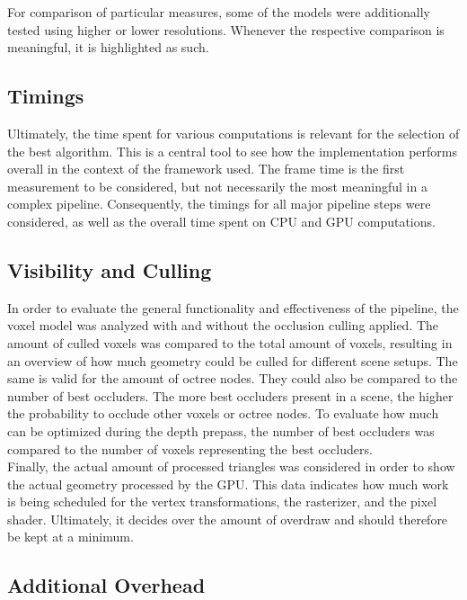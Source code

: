 \noindent
For comparison of particular measures, some of the models were additionally tested using higher or lower resolutions.
Whenever the respective comparison is meaningful, it is highlighted as such.


\subsection*{Timings} \label{subsec-timings}

Ultimately, the time spent for various computations is relevant for the selection of the best algorithm. This is 
a central tool to see how the implementation performs overall in the context of the framework used. The frame 
time is the first measurement to be considered, but not necessarily the most meaningful in a complex pipeline. 
Consequently, the timings for all major pipeline steps were considered, as well as the overall time spent on 
\ac{CPU} and \ac{GPU} computations. 


\subsection*{Visibility and Culling} \label{subsec-visibility-and-culling}

In order to evaluate the general functionality and effectiveness of the pipeline, the voxel model was analyzed 
with and without the occlusion culling applied. The amount of culled voxels was compared to the total amount of 
voxels, resulting in an overview of how much geometry could be culled for different scene setups. The same is 
valid for the amount of octree nodes. They could also be compared to the number of best occluders. The more best 
occluders present in a scene, the higher the probability to occlude other voxels or octree nodes. To evaluate 
how much can be optimized during the depth prepass, the number of best occluders was compared to the number 
of voxels representing the best occluders. \\

\noindent
Finally, the actual amount of processed triangles was considered in order to show the actual geometry processed 
by the \ac{GPU}. This data indicates how much work is being scheduled for the vertex transformations, the rasterizer, 
and the pixel shader. Ultimately, it decides over the amount of overdraw and should therefore be kept at a minimum.


\subsection*{Additional Overhead} \label{subsec-additional-overhead}

